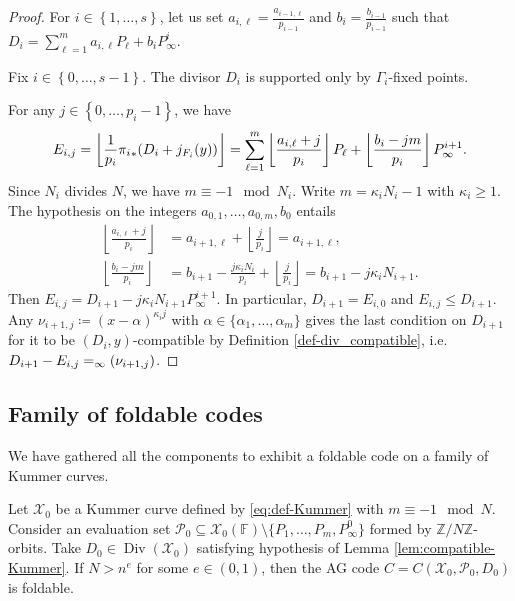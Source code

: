 \documentclass[a4paper,USenglish,autoref]{lipics-v2021}
\newcommand\F{\mathbb{F}}
\newcommand\Z{\mathbb{Z}}
\newcommand\floor[1]{\left\lfloor #1 \right\rfloor}
\newcommand\poles[1]{\div_\infty\left( #1 \right)}
\DeclareMathOperator{\Div}{Div}
\let\div\relax\DeclareMathOperator{\div}{div}
\newcommand{\set}[1]{\left\{#1\right\}}
\newcommand{\range}[1]{\set{0,\dots,#1-1}}
\newcommand{\Range}[2]{\set{#1,\dots,#2}}
\newcommand\calX{\mathcal{X}}
\newcommand\calP{\mathcal{P}}
\newcommand\mydef{\coloneqq}
\begin{document}
\begin{proof}
	For $i \in \Range{1}{s}$, let us set $a_{i,\ell}=\frac{a_{i-1,\ell}}{p_{i-1}}$ and $b_i=\frac{b_{i-1}}{p_{i-1}}$ such that  $D_i=\sum_{\ell=1}^m a_{i,\ell} P_\ell + b_i P^i_\infty$.
	
	Fix $i \in \range{s}$. The divisor $D_i$ is supported only by $\Gamma_i$-fixed points.
	
	For any ${j \in \range{p_i}}$, we have
	\[E_{i,j} = \floor{\frac{1}{p_i} {\pi_i}_* (D_i+j\div_{F_i}(y))}=\sum_{\ell=1}^m \floor{\frac{a_{i,\ell} + j}{p_i}} P_\ell + \floor{\frac{b_i-jm}{p_i}}P^{i+1}_\infty.\]
	Since $N_i$ divides $N$, we have $m \equiv -1 \mod N_i$. Write $m=\kappa_i N_i -1$ with $\kappa_i \geq 1$. 
	The hypothesis on the integers  $a_{0,1},\dots,a_{0,m},b_{0}$ entails
	\[\begin{aligned}
		\floor{\frac{a_{i,\ell} + j}{p_i}}&=a_{i+1,\ell} + \floor{\frac{j}{p_i}}= a_{i+1,\ell} , \\
		\floor{\frac{b_i-jm}{p_i}}&=b_{i+1}-\frac{j\kappa_i N_i}{p_i} + \floor{\frac{j}{p_i}} = b_{i+1}-j\kappa_i N_{i+1} .
	\end{aligned}\]
	Then $E_{i,j}= D_{i+1} - j \kappa_i N_{i+1}P^{i+1}_\infty$. In particular, $D_{i+1}=E_{i,0}$ and $E_{i,j} \leq D_{i+1}$. Any ${\nu_{i+1,j}\mydef(x-\alpha)^{\kappa_i j}}$ with ${\alpha \in \{\alpha_1,\dots,\alpha_m\}}$ gives the last condition on $D_{i+1}$ for it to be $(D_i,y)$-compatible by Definition \ref{def-div_compatible}, i.e. ${D_{i+1}-E_{i,j}= \poles{\nu_{i+1,j}}}$.
\end{proof}

\subsection{Family of foldable codes}

We have gathered all the components to exhibit a foldable code on a family of Kummer curves.

\begin{proposition}\label{prop:Kummer_foldable}
	Let $\calX_0$ be a Kummer curve defined by \eqref{eq:def-Kummer} with $m \equiv -1 \mod N$. Consider an evaluation set $\calP_0\subseteq \calX_0(\F) \setminus \{P_1,\dots, P_m,P^0_\infty\}$ formed by $\Z/N\Z$-orbits.
	Take $D_0\in \Div(\calX_0)$ satisfying hypothesis of Lemma \ref{lem:compatible-Kummer}. If $N>n^e$ for some $e \in (0,1)$, then the AG code $C=C(\calX_0,\calP_0,D_0)$ is foldable.
\end{proposition}
\end{document}
